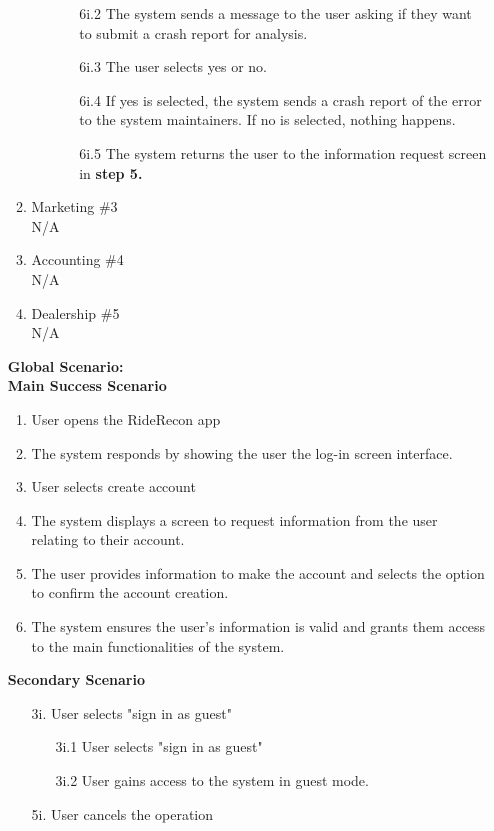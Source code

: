 \documentclass[]{article}
\begin{document}
\begin{enumerate}[label={\bf BE\arabic*.}]
\begin{enumerate}[label={\bf VP\arabic*.}]
\begin{enumerate}
\begin{enumerate}
					\item[6i.2] The system sends a message to the user asking if they want to submit a crash report for analysis.
					\item[6i.3] The user selects yes or no.
					\item[6i.4] If yes is selected, the system sends a crash report of the error to the system maintainers. If no is selected, nothing happens.
					\item[6i.5] The system returns the user to the information request screen in \textbf{step 5.}
				\end{enumerate}
			\end{enumerate}
			\item Marketing \#3\\
			N/A
			\item Accounting \#4\\
			N/A
			\item Dealership \#5\\
			N/A
		\end{enumerate}
		{\bf Global Scenario:}\\
		\textbf{Main Success Scenario}
		\begin{enumerate}[label={\arabic*.}]
			\color{red}
			\item User opens the RideRecon app
			\item The system responds by showing the user the log-in screen interface.
			\item User selects create account
			\item The system displays a screen to request information from the user relating to their account.
			\item The user provides information to make the account and selects the option to confirm the account creation.
			\item The system ensures the user's information is valid and grants them access to the main functionalities of the system.
		\end{enumerate}
		\textbf{Secondary Scenario}
		\begin{enumerate}
			\color{red}
			\item[3i.] User selects "sign in as guest"
			\begin{enumerate}
				\item[3i.1] User selects "sign in as guest"
				\item[3i.2] User gains access to the system in guest mode.  
			\end{enumerate}
			\item[5i.] User cancels the operation

\end{enumerate}
\end{enumerate}
\end{document}
